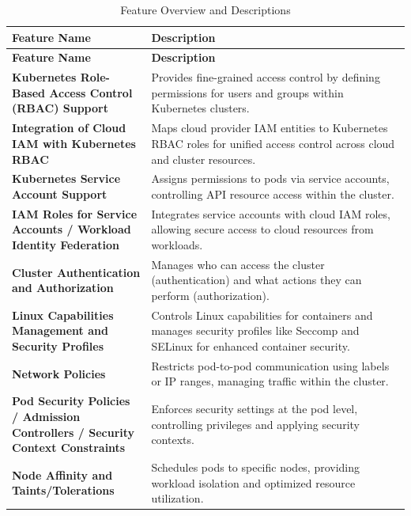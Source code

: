 \begin{longtable}{p{0.35\linewidth} p{0.65\linewidth}} %
\caption{Feature Overview and Descriptions} \label{tab:feature_overview} \\

\toprule
\textbf{Feature Name} & \textbf{Description} \\
\midrule
\endfirsthead %

\toprule
\textbf{Feature Name} & \textbf{Description} \\
\midrule
\endhead %

\bottomrule
\endfoot %

\endlastfoot %

\textbf{Kubernetes Role-Based Access Control (RBAC) Support} & Provides fine-grained access control by defining permissions for users and groups within Kubernetes clusters. \\
\hline
\textbf{Integration of Cloud IAM with Kubernetes RBAC} & Maps cloud provider IAM entities to Kubernetes RBAC roles for unified access control across cloud and cluster resources. \\
\hline
\textbf{Kubernetes Service Account Support} & Assigns permissions to pods via service accounts, controlling API resource access within the cluster. \\
\hline
\textbf{IAM Roles for Service Accounts / Workload Identity Federation} & Integrates service accounts with cloud IAM roles, allowing secure access to cloud resources from workloads. \\
\hline
\textbf{Cluster Authentication and Authorization} & Manages who can access the cluster (authentication) and what actions they can perform (authorization). \\
\hline
\textbf{Linux Capabilities Management and Security Profiles} & Controls Linux capabilities for containers and manages security profiles like Seccomp and SELinux for enhanced container security. \\
\hline
\textbf{Network Policies} & Restricts pod-to-pod communication using labels or IP ranges, managing traffic within the cluster. \\
\hline
\textbf{Pod Security Policies / Admission Controllers / Security Context Constraints} & Enforces security settings at the pod level, controlling privileges and applying security contexts. \\
\hline
\textbf{Node Affinity and Taints/Tolerations} & Schedules pods to specific nodes, providing workload isolation and optimized resource utilization. \\

\end{longtable}
